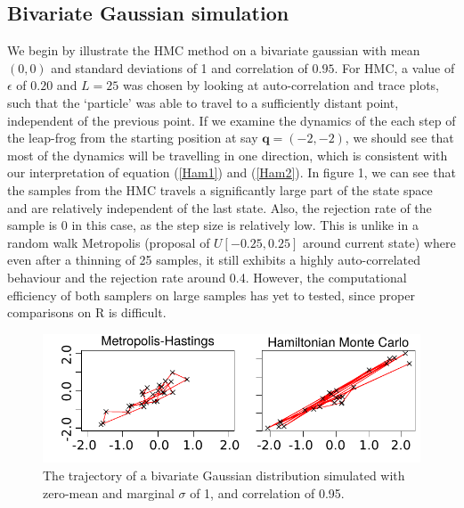\documentclass[11pt]{article}
\begin{document}
\subsection{Bivariate Gaussian simulation}
We begin by illustrate the HMC method on a bivariate gaussian with mean $(0,0)$ and standard deviations of 1 and correlation of $0.95$. For HMC, a value of $\epsilon$ of $0.20$ and $L=25$ was chosen by looking at auto-correlation and trace plots, such that the `particle' was able to travel to a sufficiently distant point, independent of the previous point. If we examine the dynamics of the each step of the leap-frog from the starting position at say $\mathbf{q}=(-2,-2)$, we should see that most of the dynamics will be travelling in one direction, which is consistent with our interpretation of equation (\ref{Ham1}) and (\ref{Ham2}). In figure 1, we can see that the samples from the HMC travels a significantly large part of the state space and are relatively independent of the last state. Also, the rejection rate of the sample is 0 in this case, as the step size is relatively low. This is unlike in a random walk Metropolis (proposal of $U[-0.25,0.25]$ around current state) where even after a thinning of 25 samples, it still exhibits a highly auto-correlated behaviour and the rejection rate around 0.4. However, the computational efficiency of both samplers on large samples has yet to tested, since proper comparisons on R is difficult.
\begin{figure}[H]
\center
  \includegraphics[width=5in]{images/MHvsHM_explore.pdf}
\caption{The trajectory of a bivariate Gaussian distribution simulated with zero-mean and marginal $\sigma$ of 1, and correlation of 0.95.}
\end{figure}
\end{document}

